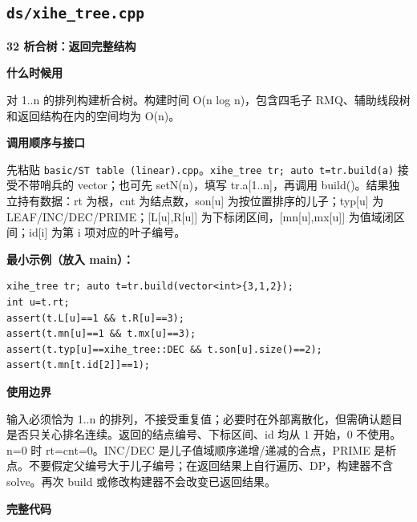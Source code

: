\documentclass[UTF8,a4paper,10pt]{ctexart}
\newcommand{\TemplUsage}[1]{\textbf{什么时候用}\par #1\par}
\newcommand{\TemplApi}[1]{\textbf{调用顺序与接口}\par #1\par}
\newcommand{\TemplNote}[1]{\textbf{使用边界}\par #1\par}
\begin{document}
\subsection{\texttt{ds/xihe\_tree.cpp}}
\textbf{32 析合树：返回完整结构}

\TemplUsage{对 1..n 的排列构建析合树。构建时间 O(n log n)，包含四毛子 RMQ、辅助线段树和返回结构在内的空间均为 O(n)。}
\TemplApi{先粘贴 \texttt{basic/ST table (linear).cpp}。\texttt{xihe\_tree tr; auto t=tr.build(a)} 接受不带哨兵的 vector；也可先 setN(n)，填写 tr.a[1..n]，再调用 build()。结果独立持有数据：rt 为根，cnt 为结点数，son[u] 为按位置排序的儿子；typ[u] 为 LEAF/INC/DEC/PRIME；[L[u],R[u]] 为下标闭区间，[mn[u],mx[u]] 为值域闭区间；id[i] 为第 i 项对应的叶子编号。}
\textbf{最小示例（放入 main）：}
\begin{lstlisting}
xihe_tree tr; auto t=tr.build(vector<int>{3,1,2});
int u=t.rt;
assert(t.L[u]==1 && t.R[u]==3);
assert(t.mn[u]==1 && t.mx[u]==3);
assert(t.typ[u]==xihe_tree::DEC && t.son[u].size()==2);
assert(t.mn[t.id[2]]==1);
\end{lstlisting}
\TemplNote{输入必须恰为 1..n 的排列，不接受重复值；必要时在外部离散化，但需确认题目是否只关心排名连续。返回的结点编号、下标区间、id 均从 1 开始，0 不使用。n=0 时 rt=cnt=0。INC/DEC 是儿子值域顺序递增/递减的合点，PRIME 是析点。不要假定父编号大于儿子编号；在返回结果上自行遍历、DP，构建器不含 solve。再次 build 或修改构建器不会改变已返回结果。}
\textbf{完整代码}
\end{document}
